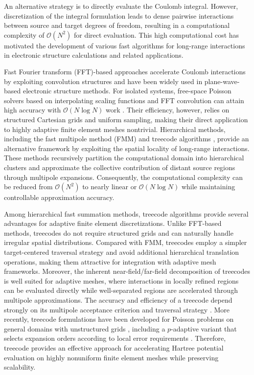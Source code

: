 \documentclass[a4paper,10pt]{article}
\begin{document}
An alternative strategy is to directly evaluate the Coulomb integral. However, discretization of the integral formulation leads to dense pairwise interactions between source and target degrees of freedom, resulting in a computational complexity of $\mathcal{O}(N^2)$ for direct evaluation. This high computational cost has motivated the development of various fast algorithms for long-range interactions in electronic structure calculations and related applications.

Fast Fourier transform (FFT)-based approaches accelerate Coulomb interactions by exploiting convolution structures and have been widely used in plane-wave-based electronic structure methods. For isolated systems, free-space Poisson solvers based on interpolating scaling functions and FFT convolution can attain high accuracy with $\mathcal{O}(N\log N)$ work \cite{Genovese2006}. Their efficiency, however, relies on structured Cartesian grids and uniform sampling, making their direct application to highly adaptive finite element meshes nontrivial. Hierarchical methods, including the fast multipole method (FMM)
\cite{Greengard1987}
and treecode algorithms
\cite{Barnes1986,Appel1985},
provide an alternative framework by exploiting the spatial locality of long-range interactions. These methods recursively partition the computational domain into hierarchical clusters and approximate the collective contribution of distant source regions through multipole expansions. Consequently, the computational complexity can be reduced from $\mathcal{O}(N^2)$ to nearly linear or $\mathcal{O}(N\log N)$ while maintaining controllable approximation accuracy.

Among hierarchical fast summation methods, treecode algorithms provide several advantages for adaptive finite element discretizations. Unlike FFT-based methods, treecodes do not require structured grids and can naturally handle irregular spatial distributions. Compared with FMM, treecodes employ a simpler target-centered traversal strategy and avoid additional hierarchical translation operations, making them attractive for integration with adaptive mesh frameworks. Moreover, the inherent near-field/far-field decomposition of treecodes is well suited for adaptive meshes, where interactions in locally refined regions can be evaluated directly while well-separated regions are accelerated through multipole approximations. The accuracy and efficiency of a treecode depend strongly on its multipole acceptance criterion and traversal strategy \cite{Salmon1994,Dehnen2000}. More recently, treecode formulations have been developed for Poisson problems on general domains with unstructured grids \cite{Cui}, including a $p$-adaptive variant that selects expansion orders according to local error requirements \cite{CuiYang2025}. Therefore, treecode provides an effective approach for accelerating Hartree potential evaluation on highly nonuniform finite element meshes while preserving scalability.
\end{document}
